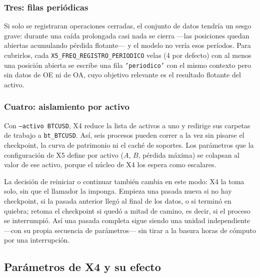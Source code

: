 \documentclass[11pt,a4paper]{article}
\newcommand{\code}[1]{\texttt{\small #1}}
\newcommand{\bigsep}{\par\vspace{3pt}}
\begin{document}
\subsubsection{Tres: filas periódicas}

Si solo se registraran operaciones cerradas, el conjunto de datos tendría un sesgo grave:
durante una caída prolongada casi nada se cierra —las posiciones quedan abiertas
acumulando pérdida flotante— y el modelo no vería esos períodos. Para cubrirlos, cada
\code{X5_FREQ_REGISTRO_PERIODICO} velas (4 por defecto) con al menos una posición abierta se
escribe una fila \code{'periodico'} con el mismo contexto pero sin datos de OE ni de OA, cuyo
objetivo relevante es el resultado flotante del activo.

\subsubsection{Cuatro: aislamiento por activo}

Con \code{--activo BTCUSD}, X4 reduce la lista de activos a uno y redirige sus carpetas de
trabajo a \code{bt_BTCUSD}. Así, seis procesos pueden correr a la vez sin pisarse el
checkpoint, la curva de patrimonio ni el caché de soportes. Los parámetros que la
configuración de X5 define por activo ($A$, $B$, pérdida máxima) se colapsan al valor de ese
activo, porque el núcleo de X4 los espera como escalares.

\bigsep
La decisión de reiniciar o continuar también cambia en este modo: X4 la toma solo, sin que el
llamador la imponga. Empieza una pasada nueva si no hay checkpoint, si la pasada anterior
llegó al final de los datos, o si terminó en quiebra; retoma el checkpoint si quedó a mitad
de camino, es decir, si el proceso se interrumpió. Así una pasada completa sigue siendo una
unidad independiente —con su propia secuencia de parámetros— sin tirar a la basura horas de
cómputo por una interrupción.

\subsection{Parámetros de X4 y su efecto}
\end{document}
